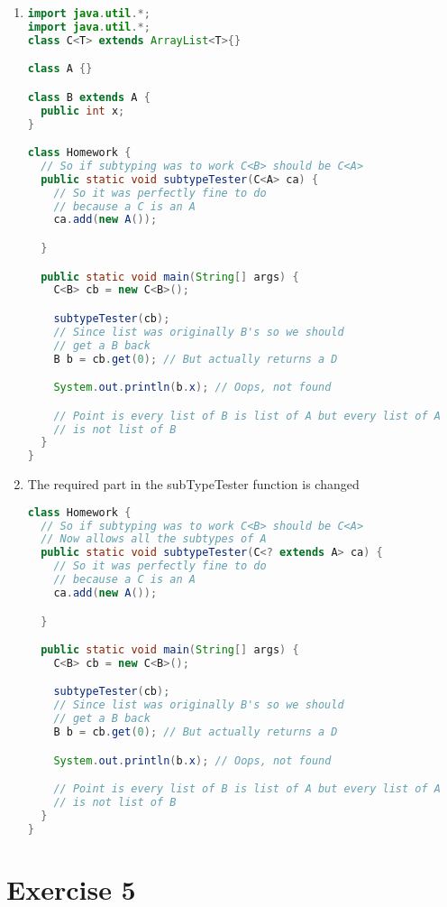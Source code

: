 \documentclass[12pt]{article}
\begin{document}
\begin{enumerate}[label=(\alph*)]
\item 

\begin{lstlisting}[language=Java]
import java.util.*;
import java.util.*;
class C<T> extends ArrayList<T>{}

class A {}

class B extends A {
  public int x;
}

class Homework {
  // So if subtyping was to work C<B> should be C<A>
  public static void subtypeTester(C<A> ca) {
    // So it was perfectly fine to do
    // because a C is an A
    ca.add(new A());

  }

  public static void main(String[] args) {
    C<B> cb = new C<B>();

    subtypeTester(cb);
    // Since list was originally B's so we should
    // get a B back
    B b = cb.get(0); // But actually returns a D

    System.out.println(b.x); // Oops, not found

    // Point is every list of B is list of A but every list of A
    // is not list of B
  }
}

\end{lstlisting}

\item The required part in the subTypeTester function is changed
\begin{lstlisting}[language=Java]
class Homework {
  // So if subtyping was to work C<B> should be C<A>
  // Now allows all the subtypes of A
  public static void subtypeTester(C<? extends A> ca) {
    // So it was perfectly fine to do
    // because a C is an A
    ca.add(new A());

  }

  public static void main(String[] args) {
    C<B> cb = new C<B>();

    subtypeTester(cb);
    // Since list was originally B's so we should
    // get a B back
    B b = cb.get(0); // But actually returns a D

    System.out.println(b.x); // Oops, not found

    // Point is every list of B is list of A but every list of A
    // is not list of B
  }
}

\end{lstlisting}
\end{enumerate}

\section*{Exercise 5}
\end{document}
